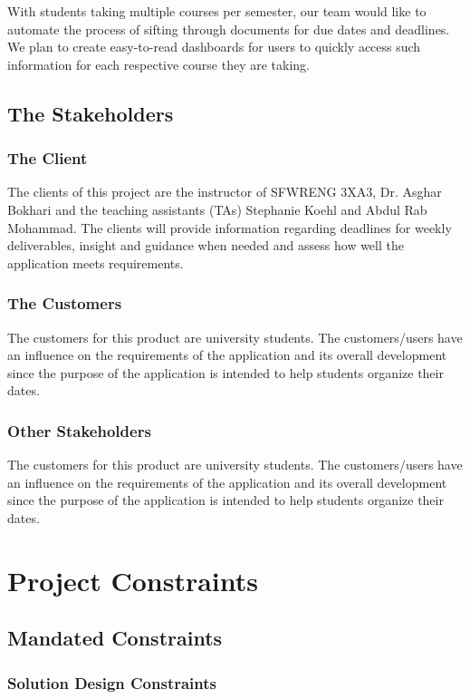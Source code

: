 \documentclass[12pt, titlepage]{article}
\begin{document}
With students taking multiple courses per semester, our team would like to automate the process of sifting through documents for due dates and deadlines. We plan to create easy-to-read dashboards for users to quickly access such information for each respective course they are taking. 

\subsection{The Stakeholders}

\subsubsection{The Client}
The clients of this project are the instructor of SFWRENG 3XA3, Dr. Asghar Bokhari and the teaching assistants (TAs) Stephanie Koehl and Abdul Rab Mohammad. The clients will provide information regarding deadlines for weekly deliverables, insight and guidance when needed and assess how well the application meets requirements.  

\subsubsection{The Customers}
The customers for this product are university students. The customers/users have an influence on the requirements of the application and its overall development since the purpose of the application is intended to help students organize their dates.  

\subsubsection{Other Stakeholders}
The customers for this product are university students. The customers/users have an influence on the requirements of the application and its overall development since the purpose of the application is intended to help students organize their dates.  

\section{Project Constraints}
\subsection{Mandated Constraints}
\subsubsection{Solution Design Constraints}
\end{document}
